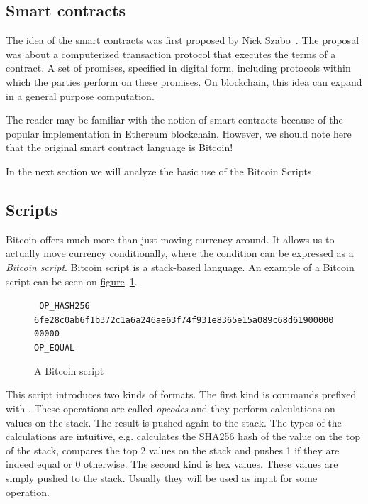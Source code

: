 \subsection{Smart contracts}
The idea of the smart contracts was first proposed by Nick Szabo~\cite{szabo}. The proposal was about a computerized transaction protocol that executes the terms of a contract. A set of promises, specified in digital form, including protocols within which the parties perform on these promises. On blockchain, this idea can expand in a general purpose computation.

The reader may be familiar with the notion of smart contracts because of the popular implementation in Ethereum blockchain. However, we should note here that the original smart contract language is Bitcoin!

In the next section we will analyze the basic use of the Bitcoin Scripts.

\subsection{Scripts} \label{sec:scripts}
Bitcoin offers much more than just moving currency around. It allows us to actually move currency conditionally, where the condition can be expressed as a \emph{Bitcoin script}. Bitcoin script is a stack-based language. An example of a Bitcoin script can be seen on \hyperref[fig:bitcoin-script]{figure}~\ref{fig:bitcoin-script}.

\vspace{0.3cm}
\begin{figure}[hb]
  \centering
  {
    \tt
    OP\_HASH256 \\
    6fe28c0ab6f1b372c1a6a246ae63f74f931e8365e15a089c68d6190000000000 \\
    OP\_EQUAL
  }
  \caption{A Bitcoin script~\cite{gtklocker}}
  \label{fig:bitcoin-script}
\end{figure}
\vspace{0.3cm}

This script introduces two kinds of formats. The first kind is commands prefixed with . These operations are called \emph{opcodes} and they perform calculations on values on the stack. The result is pushed again to the stack. The types of the calculations are intuitive, e.g.  calculates the SHA256 hash of the value on the top of the stack,  compares the top 2 values on the stack and pushes 1 if they are indeed equal or 0 otherwise. The second kind is hex values. These values are simply pushed to the stack. Usually they will be used as input for some operation.

